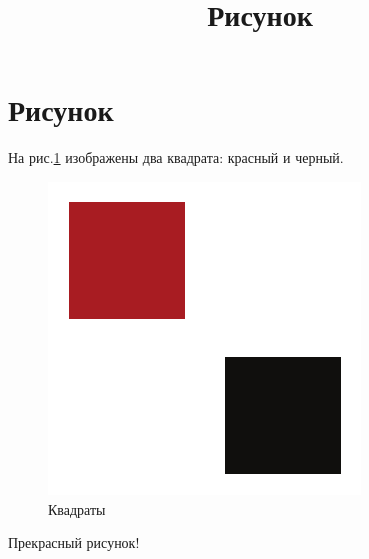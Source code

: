 \documentclass[a4paper,12pt]{article}
\title{Рисунок}
\begin{document}
\section*{Рисунок}

На рис.\ref{squares} изображены два квадрата: красный и черный.

\begin{figure}
\centering
\includegraphics[]{figure.pdf}
\caption{Квадраты}\label{squares}
\end{figure}

Прекрасный рисунок!
\end{document}
